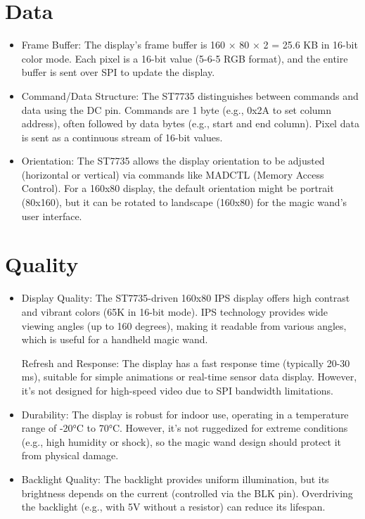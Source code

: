 \section{Data}

\begin{itemize}

	\item Frame Buffer: The display’s frame buffer is 160 × 80 × 2 = 25.6 KB in 16-bit color mode. Each pixel is a 16-bit value (5-6-5 RGB format), and the entire buffer is sent over SPI to update the display.

	\item Command/Data Structure: The ST7735 distinguishes between commands and data using the DC pin. Commands are 1 byte (e.g., 0x2A to set column address), often followed by data bytes (e.g., start and end column). Pixel data is sent as a continuous stream of 16-bit values.

	\item Orientation: The ST7735 allows the display orientation to be adjusted (horizontal or vertical) via commands like MADCTL (Memory Access Control). For a 160x80 display, the default orientation might be portrait (80x160), but it can be rotated to landscape (160x80) for the magic wand’s user interface.\cite{Sitronix:2010}

\end{itemize}



\section{Quality}



\begin{itemize}

	\item Display Quality: The ST7735-driven 160x80 IPS display offers high contrast and vibrant colors (65K in 16-bit mode). IPS technology provides wide viewing angles (up to 160 degrees), making it readable from various angles, which is useful for a handheld magic wand.

	Refresh and Response: The display has a fast response time (typically 20-30 ms), suitable for simple animations or real-time sensor data display. However, it’s not designed for high-speed video due to SPI bandwidth limitations.

	\item Durability: The display is robust for indoor use, operating in a temperature range of -20°C to 70°C. However, it’s not ruggedized for extreme conditions (e.g., high humidity or shock), so the magic wand design should protect it from physical damage.

	\item Backlight Quality: The backlight provides uniform illumination, but its brightness depends on the current (controlled via the BLK pin). Overdriving the backlight (e.g., with 5V without a resistor) can reduce its lifespan.\cite{Sitronix:2010}

\end{itemize}



